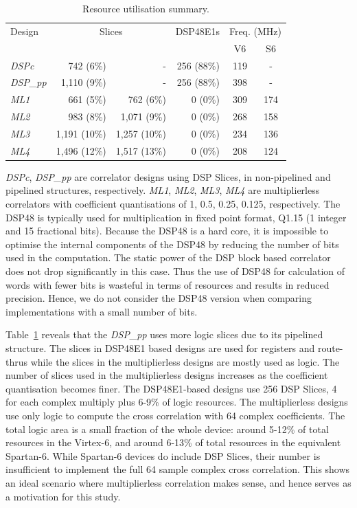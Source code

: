 \begin{table}[h]
	\centering
	\caption{Resource utilisation summary.}
	\label{tab:Imp_Rpt}
	\begin{tabular}{l|r|r|r|c|c}
        \hline \hline
    			Design  & \multicolumn{2}{|c|}{Slices} & DSP48E1s & \multicolumn{2}{|c}{Freq. (MHz)} \\
	\cline{2-6}			         & \makebox[1.2cm][c]{V6} & \makebox[1.2cm][c]{S6}& 	\makebox[1.2cm][c]{V6}	&  V6 & S6    \\
    	\hline
			\emph{DSPc} 	& 742 		(6\%)  & -  			 & 256 (88\%) & 119 & -\\
			\emph{DSP\_pp} &  1,110 	(9\%) & -  			 &  256 (88\%)& 398 & -\\
 			\emph{ML1} 	&  661		(5\%) &	762 (6\%)	 &  0 (0\%)	& 309 & 174\\
			\emph{ML2} 	&  983 	(8\%) &	1,071 (9\%) &  0 (0\%)	& 268 & 158\\
			\emph{ML3} 	&  1,191 	(10\%) &	1,257 (10\%) &  0 (0\%)	& 234 & 136\\
			\emph{ML4} 	&  1,496 	(12\%) &	1,517 (13\%) &  0 (0\%)	& 208 & 124\\

    	\hline \hline
    \end{tabular}
\end{table}

\emph{DSPc}, \emph{DSP\_pp} are correlator designs using DSP Slices, in non-pipelined and pipelined structures, respectively.
\emph{ML1}, \emph{ML2}, \emph{ML3}, \emph{ML4} are multiplierless correlators with coefficient quantisations of 1, 0.5, 0.25, 0.125, respectively.
The DSP48 is typically used for multiplication in fixed point format, Q1.15 (1 integer and 15 fractional bits). Because the DSP48 is a hard core, it is impossible to optimise the internal components of the DSP48 by reducing the number of bits used in the computation. The static power of the DSP block based correlator does not drop significantly in this case. Thus the use of DSP48 for calculation of words with fewer bits is wasteful in terms of resources and results in reduced precision. Hence, we do not consider the DSP48 version when comparing implementations with a small number of bits.

Table~\ref{tab:Imp_Rpt} reveals that the \emph{DSP\_pp} uses more logic slices due to its pipelined structure.
The slices in DSP48E1 based designs are used for registers and route-thrus while the slices in the multiplierless designs are mostly used as logic.
The number of slices used in the multiplierless designs increases as the coefficient quantisation becomes finer.
The DSP48E1-based designs use 256 DSP Slices, 4 for each complex multiply plus 6-9\% of logic resources.
The multiplierless designs use only logic to compute the cross correlation with 64 complex coefficients.
The total logic area is a small fraction of the whole device: around 5-12\% of total resources in the Virtex-6, and around 6-13\% of total resources in the equivalent Spartan-6.
While Spartan-6 devices do include DSP Slices, their number is insufficient to implement the full 64 sample complex cross correlation.
This shows an ideal scenario where multiplierless correlation makes sense, and hence serves as a motivation for this study.


